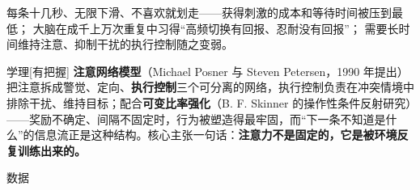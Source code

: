 \documentclass[prep,both]{debate}
\begin{document}
\begin{fields}
\begin{mechanism}[机制 （三步）]
\step 每条十几秒、无限下滑、不喜欢就划走——获得刺激的成本和等待时间被压到最低；
\step 大脑在成千上万次重复中习得“高频切换有回报、忍耐没有回报”；
\step 需要长时间维持注意、抑制干扰的执行控制随之变弱。

\end{mechanism}
\begin{evidence}{学理}[有把握]
\textbf{注意网络模型}（Michael Posner 与 Steven Petersen，1990 年提出）把注意拆成警觉、定向、\textbf{执行控制}三个可分离的网络，执行控制负责在冲突情境中排除干扰、维持目标；配合\textbf{可变比率强化}（B. F. Skinner 的操作性条件反射研究）——奖励不确定、间隔不固定时，行为被塑造得最牢固，而“下一条不知道是什么”的信息流正是这种结构。核心主张一句话：\textbf{注意力不是固定的，它是被环境反复训练出来的。}
\end{evidence}
\begin{evidence}{数据}


\end{evidence}
\end{fields}
\end{document}
